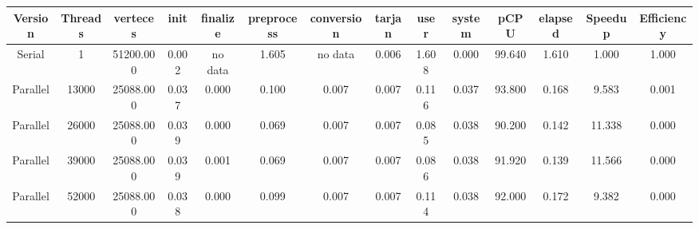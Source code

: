 \begin{tabular}{|c|c|c|c|c|c|c|c|c|c|c|c|c|c|}
\toprule
 Version &  Threads &  verteces &  init & finalize &  preprocess & conversion &  tarjan &  user &  system &   pCPU &  elapsed &  Speedup &  Efficiency \\
\midrule
  Serial &        1 & 51200.000 & 0.002 &  no data &       1.605 &    no data &   0.006 & 1.608 &   0.000 & 99.640 &    1.610 &    1.000 &       1.000 \\
Parallel &    13000 & 25088.000 & 0.037 &    0.000 &       0.100 &      0.007 &   0.007 & 0.116 &   0.037 & 93.800 &    0.168 &    9.583 &       0.001 \\
Parallel &    26000 & 25088.000 & 0.039 &    0.000 &       0.069 &      0.007 &   0.007 & 0.085 &   0.038 & 90.200 &    0.142 &   11.338 &       0.000 \\
Parallel &    39000 & 25088.000 & 0.039 &    0.001 &       0.069 &      0.007 &   0.007 & 0.086 &   0.038 & 91.920 &    0.139 &   11.566 &       0.000 \\
Parallel &    52000 & 25088.000 & 0.038 &    0.000 &       0.099 &      0.007 &   0.007 & 0.114 &   0.038 & 92.000 &    0.172 &    9.382 &       0.000 \\
\bottomrule
\end{tabular}
